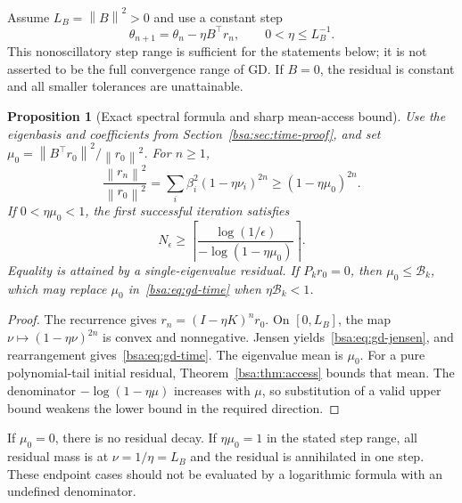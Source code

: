 \documentclass[11pt,letterpaper]{article}
\newcommand{\bsaNorm}[1]{\left\lVert #1\right\rVert}
\newtheorem{bsaProposition}{Proposition}[section]
\theoremstyle{remark}
\theoremstyle{plain}
\begin{document}
Assume $L_B=\bsaNorm B^2>0$ and use a constant step
\begin{equation}
 \theta_{n+1}=\theta_n-\eta B^\top r_n,\qquad
 0<\eta\le L_B^{-1}.
 \label{bsa:eq:gd-update}
\end{equation}
This nonoscillatory step range is sufficient for the statements below; it is not asserted to be the full convergence range of GD. If $B=0$, the residual is constant and all smaller tolerances are unattainable.

\begin{bsaProposition}[Exact spectral formula and sharp mean-access bound]
\label{bsa:prop:gd-pure}
Use the eigenbasis and coefficients from Section~\ref{bsa:sec:time-proof}, and set
$\mu_0=\bsaNorm{B^\top r_0}^2/\bsaNorm{r_0}^2$. For $n\ge1$,
\begin{equation}
 \frac{\bsaNorm{r_n}^2}{\bsaNorm{r_0}^2}
 =\sum_i\beta_i^2(1-\eta\nu_i)^{2n}
 \ge(1-\eta\mu_0)^{2n}.
 \label{bsa:eq:gd-jensen}
\end{equation}
If $0<\eta\mu_0<1$, the first successful iteration satisfies
\begin{equation}
 N_\epsilon\ge
 \left\lceil\frac{\log(1/\epsilon)}{-\log(1-\eta\mu_0)}\right\rceil.
 \label{bsa:eq:gd-time}
\end{equation}
Equality is attained by a single-eigenvalue residual. If $P_kr_0=0$, then $\mu_0\le\mathcal B_k$, which may replace $\mu_0$ in~\eqref{bsa:eq:gd-time} when $\eta\mathcal B_k<1$.
\end{bsaProposition}
\begin{proof}
The recurrence gives $r_n=(I-\eta K)^nr_0$. On $[0,L_B]$, the map
$\nu\mapsto(1-\eta\nu)^{2n}$ is convex and nonnegative. Jensen yields~\eqref{bsa:eq:gd-jensen}, and rearrangement gives~\eqref{bsa:eq:gd-time}. The eigenvalue mean is $\mu_0$. For a pure polynomial-tail initial residual, Theorem~\ref{bsa:thm:access} bounds that mean. The denominator $-\log(1-\eta\mu)$ increases with $\mu$, so substitution of a valid upper bound weakens the lower bound in the required direction.
\end{proof}
If $\mu_0=0$, there is no residual decay. If $\eta\mu_0=1$ in the stated step range, all residual mass is at $\nu=1/\eta=L_B$ and the residual is annihilated in one step. These endpoint cases should not be evaluated by a logarithmic formula with an undefined denominator.
\end{document}
